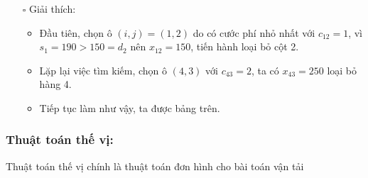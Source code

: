\documentclass{article}
\begin{document}
\begin{itemize}
    \item [$\square$] Giải thích:
    \begin{itemize}[label=\textbullet]
        \item Đầu tiên, chọn ô $(i,j)=(1,2)$ do có cước phí nhỏ nhất với $c_{12}=1$, vì $s_1= 190>150=d_2$ nên $x_{12} = 150$, tiến hành loại bỏ cột 2.
        \item Lặp lại việc tìm kiếm, chọn ô $(4,3)$ với $c_{43}=2$, ta có $x_{43}=250$ loại bỏ hàng 4.
        \item Tiếp tục làm như vậy, ta được bảng trên.
    \end{itemize}
\end{itemize}
\subsubsection{Thuật toán thế vị:}
Thuật toán thế vị chính là thuật toán đơn hình cho bài toán vận tải
\end{document}
